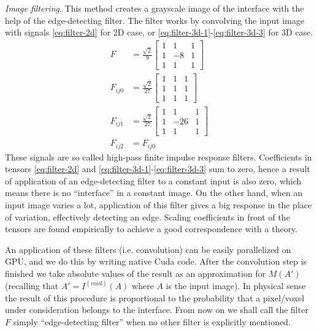 \documentclass[reprint,amsmath,amssymb,aps,pre,showkeys,showpacs]{revtex4-1}
\begin{document}
\textit{Image filtering}. This method creates a grayscale image of the interface
with the help of the edge-detecting filter. The filter works by convolving the
input image with signals \cref{eq:filter-2d} for 2D case, or
\cref{eq:filter-3d-1}-\cref{eq:filter-3d-3} for 3D case.
\begin{align}
  F &= \frac{\sqrt{2}}{9} \left[
    \begin{array}{ccc}
        1 & 1 & 1 \\
        1 & -8 & 1 \\
        1 & 1 & 1
      \end{array}
    \right] \label{eq:filter-2d} \\
  F_{ij0} &= \frac{\sqrt{2}}{27} \left[
    \begin{array}{ccc}
        1 & 1 & 1 \\
        1 & 1 & 1 \\
        1 & 1 & 1
    \end{array}
    \right] \label{eq:filter-3d-1} \\
  F_{ij1} &= \frac{\sqrt{2}}{27} \left[
    \begin{array}{ccc}
      1 & 1 & 1 \\
      1 & -26 & 1 \\
      1 & 1 & 1
    \end{array}
    \right] \label{eq:filter-3d-2} \\
  F_{ij2} &= F_{ij0} \label{eq:filter-3d-3}
\end{align}
These signals are so called high-pass finite impulse response
filters. Coefficients in tensors \cref{eq:filter-2d} and
\cref{eq:filter-3d-1}-\cref{eq:filter-3d-3} sum to zero, hence a result of
application of an edge-detecting filter to a constant input is also zero, which
means there is no ``interface'' in a constant image. On the other hand, when an
input image varies a lot, application of this filter gives a big response in the
place of variation, effectively detecting an edge. Scaling coefficients in front
of the tensors are found empirically to achieve a good correspondence with a
theory.

An application of these filters (i.e. convolution) can be easily parallelized on
GPU, and we do this by writing native Cuda code. After the convolution step is
finished we take absolute values of the result as an approximation for $M(A')$
(recalling that $A' = I^{(void)}(A)$ where $A$ is the input image). In physical
sense the result of this procedure is proportional to the probability that a
pixel/voxel under consideration belongs to the interface. From now on we shall
call the filter $F$ simply ``edge-detecting filter'' when no other filter is
explicitly mentioned.
\end{document}
